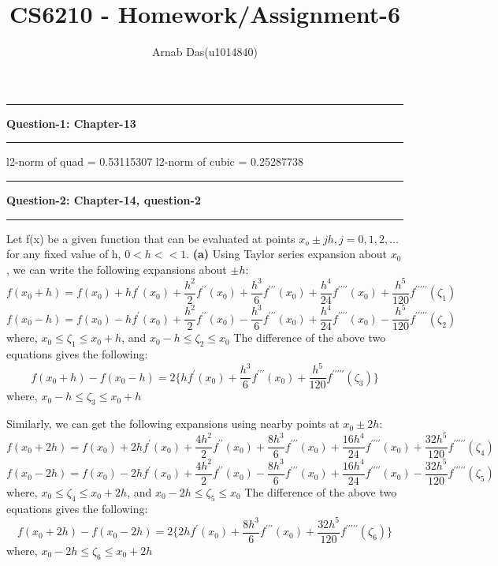 \documentclass{article}
\title{CS6210 - Homework/Assignment-6}
\author{Arnab Das(u1014840)}
\newcommand\question[2]{\vspace{.25in}\hrule\textbf{#1: #2}\hrule\vspace{.10in}}
\renewcommand\part[1]{\vspace{.10in}\textbf{(#1)}}
\begin{document}
  \maketitle
  \newpage
  \newcommand\NAME{ARNAB DAS}
  \newcommand\UID{uxxxxxxx}
  \newcommand\HWNUM{4}


  \question{Question-1}{Chapter-13}
  l2-norm of quad = 0.53115307
  l2-norm of cubic = 0.25287738

  \question{Question-2}{Chapter-14, question-2}
  Let f(x) be a given function that can be evaluated at points $x_o \pm jh, j=0,1,2,\dots$ for any fixed value of h, $0 < h << 1$. \newline
  \part{a} Using Taylor series expansion about $x_0$, we can write the following expansions about $\pm h$:
  \[ f(x_0 + h) = f(x_0) + hf^\prime(x_0) + \dfrac{h^2}{2}f^{\prime\prime}(x_0) + \dfrac{h^3}{6}f^{\prime\prime\prime}(x_0) + \dfrac{h^4}{24}f^{\prime\prime\prime\prime}(x_0) + \dfrac{h^5}{120}f^{\prime\prime\prime\prime\prime}(\zeta_1) \]
  \[ f(x_0 - h) = f(x_0) - hf^\prime(x_0) + \dfrac{h^2}{2}f^{\prime\prime}(x_0) - \dfrac{h^3}{6}f^{\prime\prime\prime}(x_0) + \dfrac{h^4}{24}f^{\prime\prime\prime\prime}(x_0) - \dfrac{h^5}{120}f^{\prime\prime\prime\prime\prime}(\zeta_2) \]
  where, $x_0 \leq \zeta_1 \leq x_0 + h$, and $x_0 - h \leq \zeta_2 \leq x_0$
  The difference of the above two equations gives the following:
  \begin{equation}
  f(x_0+h) - f(x_0-h) = 2\{ hf^\prime(x_0) + \dfrac{h^3}{6}f^{\prime\prime\prime}(x_0) + \dfrac{h^5}{120}f^{\prime\prime\prime\prime\prime}(\zeta_3) \}
  \label{eq:1ptdiff}
  \end{equation}
  where, $x_0 - h \leq \zeta_3 \leq x_0 + h$

  Similarly, we can get the following expansions using nearby points at $x_0 \pm 2h$:
  \[ f(x_0 + 2h) = f(x_0) + 2hf^\prime(x_0) + \dfrac{4h^2}{2}f^{\prime\prime}(x_0) + \dfrac{8h^3}{6}f^{\prime\prime\prime}(x_0) + \dfrac{16h^4}{24}f^{\prime\prime\prime\prime}(x_0) + \dfrac{32h^5}{120}f^{\prime\prime\prime\prime\prime}(\zeta_4) \]
  \[ f(x_0 - 2h) = f(x_0) - 2hf^\prime(x_0) + \dfrac{4h^2}{2}f^{\prime\prime}(x_0) - \dfrac{8h^3}{6}f^{\prime\prime\prime}(x_0) + \dfrac{16h^4}{24}f^{\prime\prime\prime\prime}(x_0) - \dfrac{32h^5}{120}f^{\prime\prime\prime\prime\prime}(\zeta_5) \]
  where, $x_0 \leq \zeta_4 \leq x_0 + 2h$, and $x_0 - 2h \leq \zeta_5 \leq x_0$
  The difference of the above two equations gives the following:
  \begin{equation}
  f(x_0+2h) - f(x_0-2h) = 2\{ 2hf^\prime(x_0) + \dfrac{8h^3}{6}f^{\prime\prime\prime}(x_0) + \dfrac{32h^5}{120}f^{\prime\prime\prime\prime\prime}(\zeta_6) \}
  \label{eq:2ptdiff}
  \end{equation}
  where, $x_0 - 2h \leq \zeta_6 \leq x_0 + 2h$
\end{document}
